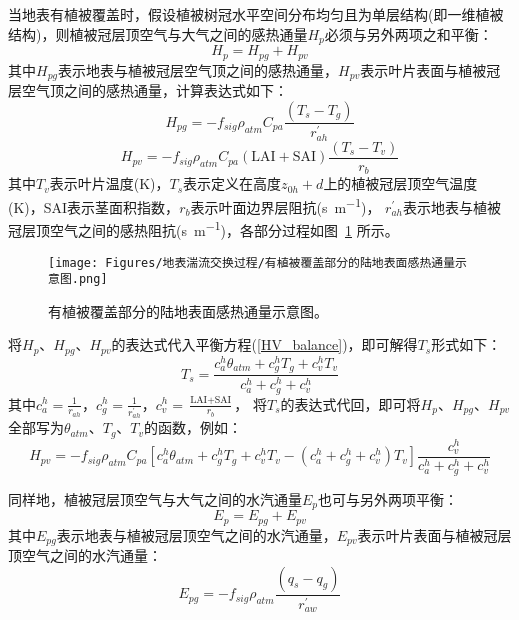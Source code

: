 当地表有植被覆盖时，假设植被树冠水平空间分布均匀且为单层结构(即一维植被结构)，则植被冠层顶空气与大气之间的感热通量$H_p$必须与另外两项之和平衡：
\begin{equation}\label{HV_balance}
H_{p}=H_{p g}+H_{p v}
\end{equation}
其中$H_{pg}$表示地表与植被冠层空气顶之间的感热通量，$H_{pv}$表示叶片表面与植被冠层空气顶之间的感热通量，计算表达式如下：
\begin{equation}
H_{p g}=-f_{sig} \rho_{atm} C_{pa} \frac{\left(T_{s}-T_{g}\right)}{r_{a h}^{\prime}}
\end{equation}
\begin{equation}
H_{p v}=-f_{sig} \rho_{atm} C_{pa}(\text {LAI}+\text {SAI}) \frac{\left(T_{s}-T_{v}\right)}{r_{b}}
\end{equation}
其中$T_v$表示叶片温度(K)，$T_s$表示定义在高度$z_{0h}+d$上的植被冠层顶空气温度(K)，SAI表示茎面积指数，$r_b$表示叶面边界层阻抗(\unit{s.m^{-1}})，
$r_{ah}^\prime$表示地表与植被冠层顶空气之间的感热阻抗(\unit{s.m^{-1}})，各部分过程如图~\ref{fig:有植被覆盖部分的陆地表面感热通量示意图} 所示。
{
\begin{figure}[]
\centering
\texttt{[image: Figures/地表湍流交换过程/有植被覆盖部分的陆地表面感热通量示意图.png]}
\caption{有植被覆盖部分的陆地表面感热通量示意图。}
\label{fig:有植被覆盖部分的陆地表面感热通量示意图}
\end{figure}
}
将$H_p$、$H_{pg}$、$H_{pv}$的表达式代入平衡方程(\ref{HV_balance})，即可解得$T_s$形式如下：
\begin{equation}
T_{s}=\frac{c_{a}^{h} \theta_{atm}+c_{g}^{h} T_{g}+c_{v}^{h} T_{v}}{c_{a}^{h}+c_{g}^{h}+c_{v}^{h}}
\end{equation}
其中$c_a^h=\frac{1}{r_{ah}}$，$c_g^h=\frac{1}{r_{ah}^\prime}$，$c_v^h=\frac{\text {LAI}+\text {SAI}}{r_b}$，
将$T_s$的表达式代回，即可将$H_p$、$H_{pg}$、$H_{pv}$全部写为$\theta_{atm}$、$T_g$、$T_v$的函数，例如：
\begin{equation}
H_{p v}=-f_{sig} \rho_{atm} C_{p a}\left[c_{a}^{h} \theta_{atm}+c_{g}^{h} 
T_{g}+c_{v}^{h} T_{v}-\left(c_{a}^{h}+c_{g}^{h}+c_{v}^{h}\right)
T_{v}\right] \frac{c_{v}^{h}}{c_{a}^{h}+c_{g}^{h}+c_{v}^{h}}
\end{equation}


同样地，植被冠层顶空气与大气之间的水汽通量$E_p$也可与另外两项平衡：
\begin{equation}\label{EV_balance}
E_{p}=E_{p g}+E_{p v}
\end{equation}
其中$E_{pg}$表示地表与植被冠层顶空气之间的水汽通量，$E_{pv}$表示叶片表面与植被冠层顶空气之间的水汽通量：
\begin{equation}
E_{pg}=-f_{sig} \rho_{atm} \frac{\left(q_{s}-q_{g}\right)}{r_{a w}^{\prime}}
\end{equation}


